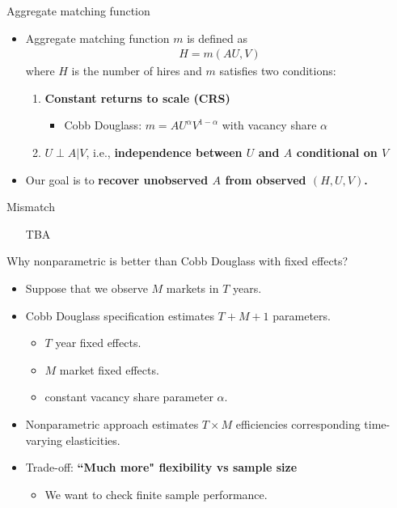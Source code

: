 \documentclass[aspectratio=169]{beamer}
\begin{document}
\begin{frame}{Aggregate matching function}
\begin{itemize}
    \item Aggregate matching function $m$ is defined as
    \begin{align*}
        H=m(AU,V)
    \end{align*}
    where $H$ is the number of hires and $m$ satisfies two conditions:
    \begin{enumerate}
        \item \textbf{Constant returns to scale (CRS)}
        \begin{itemize}
            \item Cobb Douglass: $m=AU^{\alpha}V^{1-\alpha}$ with vacancy share $\alpha$
        \end{itemize}
        \item $U\perp A|V$, i.e., \textbf{independence between $U$ and $A$ conditional on $V$}
    \end{enumerate}
    
        \item Our goal is to \textbf{recover unobserved $A$ from observed $(H,U,V)$.}
\end{itemize}
    
\end{frame}

\begin{frame}{Mismatch}
    \begin{itemize}
    \item [TBA]
\end{itemize}
\end{frame}


\begin{frame}{Why nonparametric is better than Cobb Douglass with fixed effects?}
\begin{itemize}
    \item Suppose that we observe $M$ markets in $T$ years.
    \item Cobb Douglass specification estimates $T+M+1$ parameters.
    \begin{itemize}
        \item $T$ year fixed effects.
        \item $M$ market fixed effects.
        \item constant vacancy share parameter $\alpha$.
    \end{itemize}
    \item Nonparametric approach estimates $T\times M$ efficiencies corresponding time-varying elasticities.
    \item Trade-off: \textbf{``Much more" flexibility vs sample size}
    \begin{itemize}
        \item We want to check finite sample performance.
    \end{itemize}
\end{itemize}
    
\end{frame}
\end{document}
